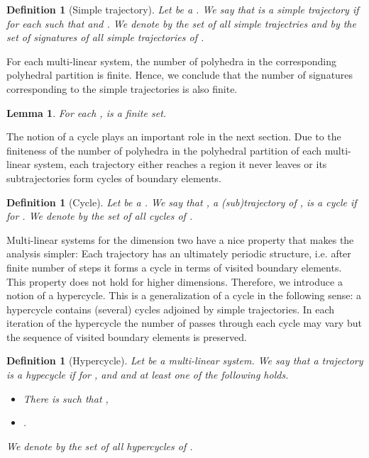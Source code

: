 \documentclass[copyright,creativecommons]{packages/eptcs}
\newtheorem{lemma}[theorem]{Lemma}
\newtheorem{definition}[theorem]{Definition}
\begin{document}
\begin{definition}[Simple trajectory] Let   be a .   We say that  is a simple  trajectory if  
 for each  such that  and .  We denote by  the set of all simple trajectries and by 
 the set of signatures of all simple  trajectories of .  
\end{definition}

For each multi-linear system,  the number of polyhedra in the corresponding  polyhedral partition is finite. Hence, we conclude that the number of signatures corresponding to the simple trajectories is also finite. 

\begin{lemma}\label{lemma:finite_simple_signature}  For each   ,   is a finite set.  
\end{lemma}

The  notion of a cycle plays an important role in the next  section. Due to the finiteness of the  number of polyhedra in the polyhedral partition of each multi-linear system, each trajectory either reaches a region it never leaves or its subtrajectories  form cycles of boundary elements. 

\begin{definition}[Cycle]  Let   be a . We say that  , a (sub)trajectory of  ,  is a cycle if  for . We denote by  the set of all cycles of .
 
\end{definition}


Multi-linear systems for the dimension two have a nice property that makes the analysis  simpler: 
Each trajectory has an ultimately periodic structure, i.e. after finite number of steps
it forms a cycle in terms of visited boundary elements. This property does not hold for higher dimensions.  Therefore, we introduce a   notion of a hypercycle. This  is a generalization of a cycle in the following sense: a hypercycle contains (several) cycles adjoined by simple trajectories. In each iteration of the hypercycle the number of passes through each  cycle may vary but the sequence of visited boundary elements is preserved. 

\begin{definition}[Hypercycle] Let  be a multi-linear system.
We say that a trajectory   is a hypecycle  if  for ,   and  and at least one of the following holds.
\begin{itemize}
 \item There is  such that ,
\item .
\end{itemize}

We denote by  the set of all hypercycles of .
\end{definition}
\end{document}
